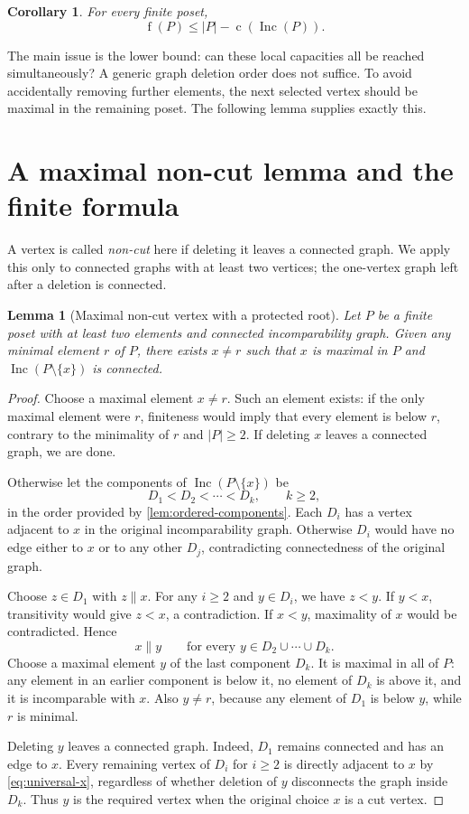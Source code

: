 \documentclass[11pt,letterpaper]{article}
\newtheorem{lemma}[lemma]{Lemma}
\newtheorem{corollary}[corollary]{Corollary}
\theoremstyle{definition}
\theoremstyle{remark}
\newcommand{\fot}{\operatorname{f}}
\newcommand{\Inc}{\operatorname{Inc}}
\newcommand{\cc}{\operatorname{c}}
\begin{document}
\begin{corollary}\label{cor:upper}
For every finite poset,
\[
 \fot(P)\leq |P|-\cc(\Inc(P)).
\]
\end{corollary}

The main issue is the lower bound: can these local capacities all be reached
simultaneously? A generic graph deletion order does not suffice. To avoid
accidentally removing further elements, the next selected vertex should be
maximal in the remaining poset. The following lemma supplies exactly this.

\section{A maximal non-cut lemma and the finite formula}
\label{sec:main}
A vertex is called \emph{non-cut} here if deleting it leaves a connected graph.
We apply this only to connected graphs with at least two vertices; the
one-vertex graph left after a deletion is connected.

\begin{lemma}[Maximal non-cut vertex with a protected root]\label{lem:noncut}
Let $P$ be a finite poset with at least two elements and connected
incomparability graph. Given any minimal element $r$ of $P$, there exists
$x\ne r$ such that $x$ is maximal in $P$ and $\Inc(P\setminus\{x\})$
is connected.
\end{lemma}
\begin{proof}
Choose a maximal element $x\ne r$. Such an element exists: if the only
maximal element were $r$, finiteness would imply that every element is
below $r$, contrary to the minimality of $r$ and $|P|\geq2$.
If deleting $x$ leaves a connected graph, we are done.

Otherwise let the components of $\Inc(P\setminus\{x\})$ be
\[
 D_1<D_2<\cdots<D_k,\qquad k\geq2,
\]
in the order provided by \cref{lem:ordered-components}. Each $D_i$ has a
vertex adjacent to $x$ in the original incomparability graph. Otherwise
$D_i$ would have no edge either to $x$ or to any other $D_j$, contradicting
connectedness of the original graph.

Choose $z\in D_1$ with $z\parallel x$. For any $i\geq2$ and $y\in D_i$,
we have $z<y$. If $y<x$, transitivity would give $z<x$, a contradiction.
If $x<y$, maximality of $x$ would be contradicted. Hence
\begin{equation}\label{eq:universal-x}
 x\parallel y\qquad\text{for every }y\in D_2\cup\cdots\cup D_k.
\end{equation}
Choose a maximal element $y$ of the last component $D_k$. It is maximal
in all of $P$: any element in an earlier component is below it, no element
of $D_k$ is above it, and it is incomparable with $x$.
Also $y\ne r$, because any element of $D_1$ is below $y$, while $r$ is
minimal.

Deleting $y$ leaves a connected graph. Indeed, $D_1$ remains connected and
has an edge to $x$. Every remaining vertex of $D_i$ for $i\geq2$ is directly
adjacent to $x$ by \eqref{eq:universal-x}, regardless of whether deletion of
$y$ disconnects the graph inside $D_k$. Thus $y$ is the required vertex
when the original choice $x$ is a cut vertex.
\end{proof}
\end{document}
